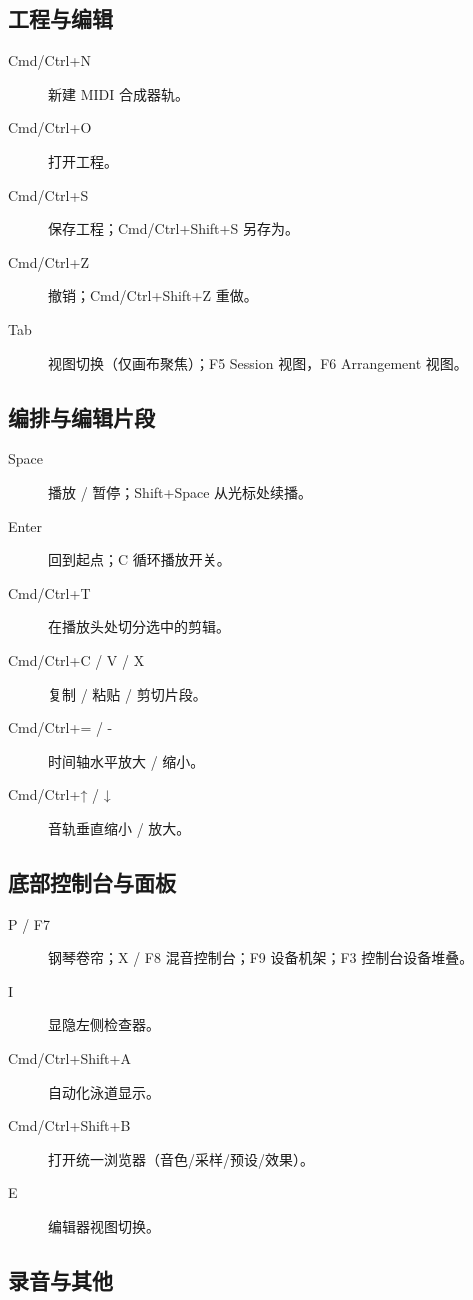 \subsection{工程与编辑}

\begin{description}
  \item[Cmd/Ctrl+N] 新建 MIDI 合成器轨。
  \item[Cmd/Ctrl+O] 打开工程。
  \item[Cmd/Ctrl+S] 保存工程；Cmd/Ctrl+Shift+S 另存为。
  \item[Cmd/Ctrl+Z] 撤销；Cmd/Ctrl+Shift+Z 重做。
  \item[Tab] 视图切换（仅画布聚焦）；F5 Session 视图，F6 Arrangement 视图。
\end{description}

\subsection{编排与编辑片段}

\begin{description}
  \item[Space] 播放 / 暂停；Shift+Space 从光标处续播。
  \item[Enter] 回到起点；C 循环播放开关。
  \item[Cmd/Ctrl+T] 在播放头处切分选中的剪辑。
  \item[Cmd/Ctrl+C / V / X] 复制 / 粘贴 / 剪切片段。
  \item[Cmd/Ctrl+= / -] 时间轴水平放大 / 缩小。
  \item[Cmd/Ctrl+↑ / ↓] 音轨垂直缩小 / 放大。
\end{description}

\subsection{底部控制台与面板}

\begin{description}
  \item[P / F7] 钢琴卷帘；X / F8 混音控制台；F9 设备机架；F3 控制台设备堆叠。
  \item[I] 显隐左侧检查器。
  \item[Cmd/Ctrl+Shift+A] 自动化泳道显示。
  \item[Cmd/Ctrl+Shift+B] 打开统一浏览器（音色/采样/预设/效果）。
  \item[E] 编辑器视图切换。
\end{description}

\subsection{录音与其他}

